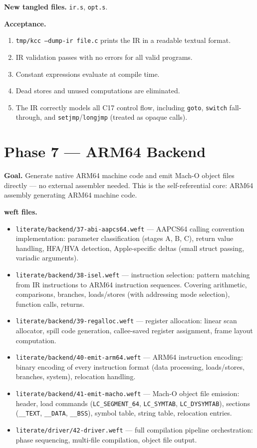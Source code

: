 \documentclass[11pt,a4paper,twoside,openright,DIV=15]{scrbook}
\theoremstyle{definition}
\theoremstyle{plain}
\theoremstyle{remark}
\begin{document}
\textbf{New tangled files.}
\texttt{ir.s}, \texttt{opt.s}.

\textbf{Acceptance.}
\begin{enumerate}
\item \texttt{tmp/kcc --dump-ir file.c} prints the IR in a
      readable textual format.
\item IR validation passes with no errors for all valid programs.
\item Constant expressions evaluate at compile time.
\item Dead stores and unused computations are eliminated.
\item The IR correctly models all C17 control flow, including
      \texttt{goto}, \texttt{switch} fall-through, and
      \texttt{setjmp}/\texttt{longjmp} (treated as opaque calls).
\end{enumerate}

\section{Phase 7 --- ARM64 Backend}
\label{sec:phase7}

\textbf{Goal.}  Generate native ARM64 machine code and emit
Mach-O object files directly --- no external assembler needed.
This is the self-referential core: ARM64 assembly generating
ARM64 machine code.

\textbf{weft files.}
\begin{itemize}
\item \texttt{literate/backend/37-abi-aapcs64.weft} ---
      AAPCS64 calling convention implementation: parameter
      classification (stages A, B, C), return value handling,
      HFA/HVA detection, Apple-specific deltas (small struct
      passing, variadic arguments).
\item \texttt{literate/backend/38-isel.weft} ---
      instruction selection: pattern matching from IR
      instructions to ARM64 instruction sequences.  Covering
      arithmetic, comparisons, branches, loads/stores (with
      addressing mode selection), function calls, returns.
\item \texttt{literate/backend/39-regalloc.weft} ---
      register allocation: linear scan allocator, spill code
      generation, callee-saved register assignment, frame
      layout computation.
\item \texttt{literate/backend/40-emit-arm64.weft} ---
      ARM64 instruction encoding: binary encoding of every
      instruction format (data processing, loads/stores,
      branches, system), relocation handling.
\item \texttt{literate/backend/41-emit-macho.weft} ---
      Mach-O object file emission: header, load commands
      (\texttt{LC\_SEGMENT\_64}, \texttt{LC\_SYMTAB},
      \texttt{LC\_DYSYMTAB}), sections (\texttt{\_\_TEXT},
      \texttt{\_\_DATA}, \texttt{\_\_BSS}), symbol table,
      string table, relocation entries.
\item \texttt{literate/driver/42-driver.weft} ---
      full compilation pipeline orchestration: phase sequencing,
      multi-file compilation, object file output.
\end{itemize}
\end{document}
